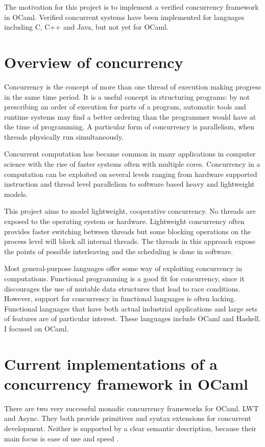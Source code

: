 \documentclass[12pt,twoside,notitlepage]{report}
\theoremstyle{plain}%
\theoremstyle{definition}
\theoremstyle{remark}
\begin{document}
The motivation for this project is to implement a verified concurrency framework in OCaml. Verified concurrent systems have been implemented for languages including C\cite{sevvcik2011relaxed}, C++ and Java\cite{lochbihler2012machine}, but not yet for OCaml. 

\section{Overview of concurrency}
Concurrency is the concept of more than one thread of execution making progress in the same time period. It is a useful concept in structuring programs: by not prescribing an order of execution for parts of a program, automatic tools and runtime systems may find a better ordering than the programmer would have at the time of programming. A particular form of concurrency is parallelism, when threads physically run simultaneously.

Concurrent computation has became common in many applications in computer science with the rise of faster systems often with multiple cores. Concurrency in a computation can be exploited on several levels ranging from hardware supported instruction and thread level parallelism to software based heavy and lightweight models. 

This project aims to model lightweight, cooperative concurrency. No threads are exposed to the operating system or hardware. Lightweight concurrency often provides faster switching between threads  but some blocking operations on the process level will block all internal threads. The threads in this approach expose the points of possible interleaving and the scheduling is done in software.

Most general-purpose languages offer some way of exploiting concurrency in computations. Functional programming is a good fit for concurrency, since it discourages the use of mutable data structures that lead to race conditions.  However, support for concurrency in functional languages is often lacking. Functional languages that have both actual industrial applications and large sets of features are of particular interest. These languages include OCaml and Haskell. I focused on OCaml. 
 

\section{Current implementations of a concurrency framework in OCaml}
There are two very successful monadic concurrency frameworks for OCaml. LWT\cite{LWT} and Async\cite{Async}. They both provide primitives and syntax extensions for concurrent development. Neither is supported by a clear semantic description, because their main focus is ease of use and speed . 
\end{document}
